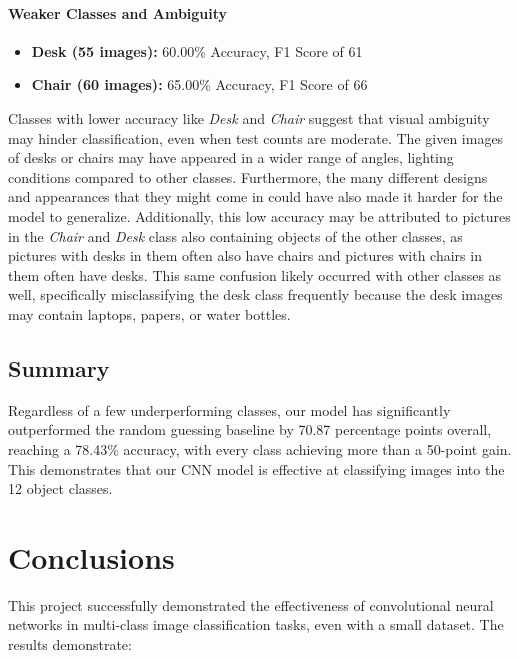 \documentclass[10pt]{article}
\begin{document}
\paragraph{Weaker Classes and Ambiguity}
\begin{itemize}
  \item \textbf{Desk (55 images):} 60.00\% Accuracy, F1 Score of 61
  \item \textbf{Chair (60 images):} 65.00\% Accuracy, F1 Score of 66
\end{itemize}
Classes with lower accuracy like \emph{Desk} and \emph{Chair} suggest that visual ambiguity may hinder classification, even when test counts are moderate. The given images of desks or chairs may have appeared in a wider range of angles, lighting conditions compared to other classes. Furthermore, the many different designs and appearances that they might come in could have also made it harder for the model to generalize. Additionally, this low accuracy may be attributed to pictures in the \emph{Chair} and \emph{Desk} class also containing objects of the other classes, as pictures with desks in them often also have chairs and pictures with chairs in them often have desks. This same confusion likely occurred with other classes as well, specifically misclassifying the desk class frequently because the desk images may contain laptops, papers, or water bottles.

\subsection{Summary}
Regardless of a few underperforming classes, our model has significantly outperformed the random guessing baseline by 70.87 percentage points overall, reaching a 78.43\% accuracy, with every class achieving more than a 50-point gain. 
This demonstrates that our CNN model is effective at classifying images into the 12 object classes. 





\section{Conclusions}
This project successfully demonstrated the effectiveness of convolutional neural networks in multi-class image classification tasks, even with a small dataset. The results demonstrate:
\end{document}
